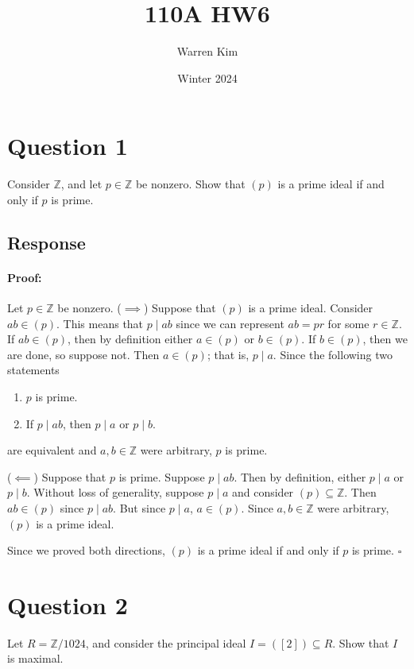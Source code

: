 \documentclass [12pt] {article}
\title{110A HW6}
\author{Warren Kim}
\date{Winter 2024}
\newcommand{\Z}{\mathbb{Z}}
\newenvironment{proof}{\paragraph{Proof:}}{\hfill$\square$}
\begin{document}
\maketitle

\section*{Question 1}
Consider $\Z$, and let $p\in\Z$ be nonzero. Show that $(p)$ is a prime ideal if and only if $p$ is prime. 
\subsection*{Response}
\begin{proof}
    Let $p \in \Z$ be nonzero. 
    \newline
    ($\implies$)
    Suppose that $(p)$ is a prime ideal. Consider $ab \in (p)$. This means that $p \mid ab$ since
    we can represent $ab = pr$ for some $r \in \Z$. If $ab \in (p)$, then by definition either 
    $a \in (p)$ or $b \in (p)$. If $b \in (p)$, then we are done, so suppose not. Then $a \in (p)$;
    that is, $p \mid a$. Since the following two statements
    \begin{enumerate}
        \item $p$ is prime.
        \item If $p \mid ab$, then $p \mid a$ or $p \mid b$.
    \end{enumerate}
    are equivalent and $a, b \in \Z$ were arbitrary, $p$ is prime.
    \vspace{0.5em}

    ($\impliedby$)
    Suppose that $p$ is prime. Suppose $p \mid ab$. Then by definition, either $p \mid a$ or $p \mid b$.
    Without loss of generality, suppose $p \mid a$ and consider $(p) \subseteq \Z$. Then 
    $ab \in (p)$ since $p \mid ab$. But since $p \mid a$, $a \in (p)$. Since $a, b \in \Z$ were
    arbitrary, $(p)$ is a prime ideal.
    \vspace{0.5em}

    Since we proved both directions, $(p)$ is a prime ideal if and only if $p$ is prime.
\end{proof}

\newpage
\section*{Question 2}
Let $R=\Z/1024$, and consider the principal ideal $I=([2])\subseteq R$. Show that $I$ is maximal. 
\end{document}
